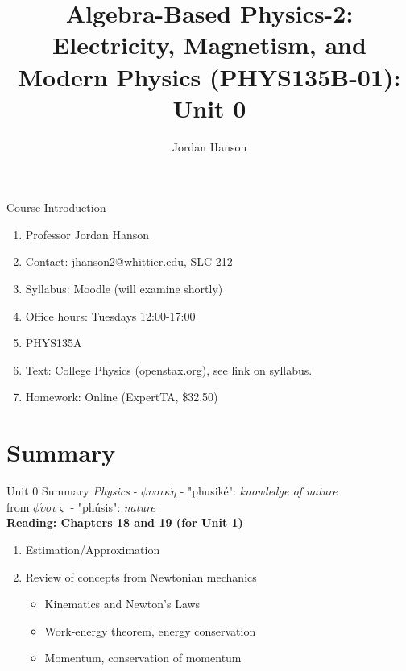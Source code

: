\documentclass{beamer}
\title{Algebra-Based Physics-2: Electricity, Magnetism, and Modern Physics (PHYS135B-01): Unit 0}
\author{Jordan Hanson}
\institute{Whittier College Department of Physics and Astronomy}
\begin{document}
\maketitle

\begin{frame}{Course Introduction}
\begin{enumerate}
\item Professor Jordan Hanson
\item Contact: jhanson2@whittier.edu, SLC 212
\item Syllabus: Moodle (will examine shortly)
\item Office hours: Tuesdays 12:00-17:00
\item PHYS135A
\item Text: College Physics (openstax.org), see link on syllabus.
\item Homework: Online (ExpertTA, \$32.50)
\end{enumerate}
\end{frame}

\section{Summary}

\begin{frame}{Unit 0 Summary}
\textit{Physics} - $\phi\upsilon\sigma\iota\kappa\acute{\eta}$ - "phusik\'e": \textit{knowledge of nature} \\
from $\phi\acute{\upsilon}\sigma\iota\varsigma$ - "ph\'usis": \textit{nature} \\
\textbf{Reading: Chapters 18 and 19 (for Unit 1)}
\begin{enumerate}
\item Estimation/Approximation
\item Review of concepts from Newtonian mechanics
\begin{itemize}
\item Kinematics and \alert{Newton's Laws}
\item Work-energy theorem, energy conservation
\item Momentum, conservation of momentum
\end{itemize}
\end{enumerate}
\end{frame}
\end{document}
